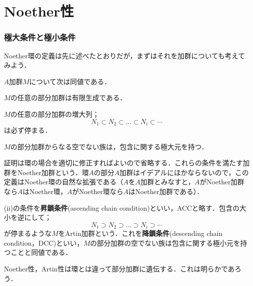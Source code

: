 \newpage
\part[Noetherian properties]{Noether性}
\section{極大条件と極小条件}
Noether環の定義は先に述べたとおりだが，まずはそれを加群についても考えてみよう．
\begin{prop}
	$A$加群$M$について次は同値である．
	\begin{sakura}
		\item $M$の任意の部分加群は有限生成である．
		\item $M$の任意の部分加群の増大列；
		\[N_1\subset N_2\subset\dots\subset N_i\subset\cdots\]
		は必ず停まる．
		\item $M$の部分加群からなる空でない族は，包含に関する極大元を持つ．
	\end{sakura}
\end{prop} 

証明は環の場合を適切に修正すればよいので省略する．これらの条件を満たす加群をNoether加群という．環$A$の部分$A$加群はイデアルにほかならないので，この定義はNoether環の自然な拡張である（$A$を$A$加群とみなすと，$A$がNoether加群なら$A$はNoether環，$A$がNoether環なら$A$はNoether加群である）．

(ii)の条件を\textbf{昇鎖条件}(ascending chain condition)といい，ACCと略す．包含の大小を逆にして；
\[N_1\supset N_2\supset\dots\supset N_i\supset\cdots\]
が停まるような$M$をArtin加群という．これを\textbf{降鎖条件}(descending chain condition，DCC)といい，$M$の部分加群の空でない族は包含に関する極小元を持つことと同値である．

Noether性，Artin性は環とは違って部分加群に遺伝する．これは明らかであろう．

